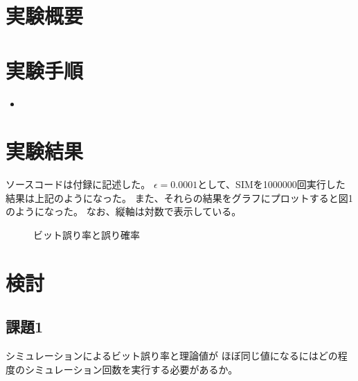 \documentclass[12pt]{jarticle}
\begin{document}



\section{実験概要}

\section{実験手順}
\begin{itemize}
    \item
\end{itemize}

\section{実験結果}

ソースコードは付録に記述した。
$\epsilon=0.0001$として、SIMを1000000回実行した結果は上記のようになった。
また、それらの結果をグラフにプロットすると図1のようになった。
なお、縦軸は対数で表示している。

\begin{figure}[h]
    \begin{center}
    \end{center}
    \caption{ビット誤り率と誤り確率}
\end{figure}

\section{検討}
\subsection{課題1}
\begin{shadebox}
    シミュレーションによるビット誤り率と理論値が
    ほぼ同じ値になるにはどの程度のシミュレーション回数を実行する必要があるか。
\end{shadebox}
\end{document}
